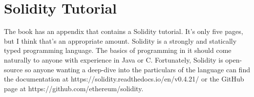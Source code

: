 \documentclass{article}
\begin{document}
\section{Solidity Tutorial}
The book has an appendix that contains a Solidity tutorial. It's only five pages, but I think that's an appropriate amount. Solidity is a strongly and statically typed programming language. The basics of programming in it should come naturally to anyone with experience in Java or C. Fortunately, Solidity is open-source so
anyone wanting a deep-dive into the particulars of the language can find the documentation at https://solidity.readthedocs.io/en/v0.4.21/ or the GitHub page at https://github.com/ethereum/solidity.
\end{document}
